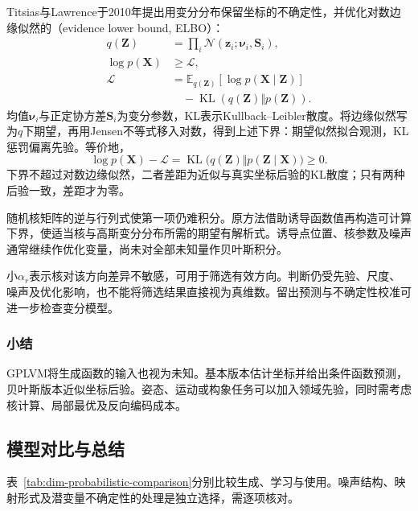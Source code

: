 Titsias与Lawrence于2010年提出用变分分布保留坐标的不确定性，并优化对数边缘似然的（evidence lower bound, ELBO）：
\begin{equation}
\label{eq:dim-gplvm-elbo}
\begin{aligned}
q(\bm{Z})&=\prod_i\mathcal{N}(\bm{z}_i;\bm{\nu}_i,\bm{S}_i),\\
\log p(\bm{X})&\geq\mathcal{L},\\
\mathcal{L}
&=\mathbb{E}_{q(\bm{Z})}[\log p(\bm{X}\mid\bm{Z})]\\
&\quad-\operatorname{KL}(q(\bm{Z})\Vert p(\bm{Z})).
\end{aligned}
\end{equation}
均值$\bm{\nu}_i$与正定协方差$\bm{S}_i$为变分参数，KL表示Kullback--Leibler散度。将边缘似然写为$q$下期望，再用Jensen不等式移入对数，得到上述下界：期望似然拟合观测，KL惩罚偏离先验。等价地，
\[
  \log p(\bm{X})-\mathcal{L}
  =\operatorname{KL}\bigl(q(\bm{Z})\Vert p(\bm{Z}\mid\bm{X})\bigr)
  \geq0.
\]
下界不超过对数边缘似然，二者差距为近似与真实坐标后验的KL散度；只有两种后验一致，差距才为零。

随机核矩阵的逆与行列式使第一项仍难积分。原方法借助诱导函数值再构造可计算下界，使适当核与高斯变分分布所需的期望有解析式。诱导点位置、核参数及噪声通常继续作优化变量，尚未对全部未知量作贝叶斯积分。

小$\alpha_r$表示核对该方向差异不敏感，可用于筛选有效方向。判断仍受先验、尺度、噪声及优化影响，也不能将筛选结果直接视为真维数。留出预测与不确定性校准可进一步检查变分模型。

\subsubsection{小结}
\label{sec:dim-gplvm-summary}

GPLVM将生成函数的输入也视为未知。基本版本估计坐标并给出条件函数预测，贝叶斯版本近似坐标后验。姿态、运动或构象任务可以加入领域先验，同时需考虑核计算、局部最优及反向编码成本。

\subsection{模型对比与总结}
\label{sec:dim-probabilistic-comparison}

表~\ref{tab:dim-probabilistic-comparison}分别比较生成、学习与使用。噪声结构、映射形式及潜变量不确定性的处理是独立选择，需逐项核对。

